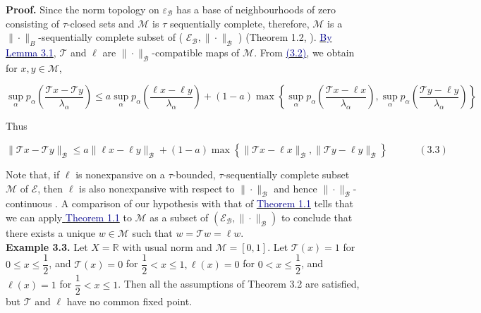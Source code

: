 \documentclass[12pt,a4paper,two side]{article}
\begin{document}
\textbf{Proof.} Since the norm topology on $\varepsilon_{\mathcal{B}}$ has a base of neighbourhoods of zero consisting of $\tau$-closed sets and $\mathcal{M}$ is $\tau$ sequentially complete, therefore, $\mathcal{M}$ is a $\|\cdot\|_B$-sequentially complete subset of ( $\mathcal{E}_{\mathscr{B}},\|\cdot\|_{\mathcal{B}}$ ) (Theorem 1.2, \cite{citation-key10}). \hyperlink{muc3.1}{\textcolor{Darkblue}{By Lemma 3.1}}, $\mathcal{T}$ and $\ell$ are $\|\cdot\|_{\mathcal{B}}$-compatible maps of $\mathcal{M}$. From \hyperlink{dau3.2}{\textcolor{Darkblue}{(3.2)}}, we obtain for $x, y \in \mathcal{M}$,

$$
\sup _\alpha p_\alpha\left(\frac{\mathcal{T} x-\mathcal{T} y}{\lambda_\alpha}\right) \leq a \sup _\alpha p_\alpha\left(\frac{\ell x-\ell y}{\lambda_\alpha}\right)+(1-a) \max \left\{\sup _\alpha p_\alpha\left(\frac{\mathcal{T} x-\ell x}{\lambda_\alpha}\right), \sup _\alpha p_\alpha\left(\frac{\mathcal{T} y-\ell y}{\lambda_\alpha}\right)\right\}
$$


Thus

$$
\|\mathcal{T} x-\mathcal{T} y\|_{\mathcal{B}} \leq a\|\ell x-\ell y\|_{\mathcal{B}}+(1-a) \max \left\{\|\mathcal{T} x-\ell x\|_{\mathcal{B}},\|\mathcal{T} y-\ell y\|_{\mathcal{B}}\right\}
\ \ \ \ \ \ \ \ \ \ \  \ \ \ (3.3)$$


Note that, if $\ell$ is nonexpansive on a $\tau$-bounded, $\tau$-sequentially complete subset $\mathcal{M}$ of $\mathcal{E}$, then $\ell$ is also nonexpansive with respect to $\|\cdot\|_{\mathcal{B}}$ and hence $\|\cdot\|_{\mathcal{B}}$-continuous \cite{citation-key8}. A comparison of our hypothesis with that of \hyperlink{muc1.1}{\textcolor{Darkblue}{Theorem 1.1}} tells that we can apply\hyperlink{muc1.1}{ \textcolor{Darkblue}{Theorem 1.1}} to $\mathcal{M}$ as a subset of $\left(\mathcal{E}_{\mathcal{B}},\|\cdot\|_{\mathcal{B}}\right)$ to conclude that there exists a unique $w \in \mathcal{M}$ such that $w=\mathcal{T} w=\ell w$.\\

\textbf{Example 3.3.} Let $X=\mathbb{R}$ with usual norm and $\mathcal{M}=[0,1]$. Let $\mathcal{T}(x)=1$ for $0 \leq x \leq \dfrac{1}{2}$, and $\mathcal{T}(x)=0$ for $\dfrac{1}{2}<x \leq 1, \ell(x)=0$ for $0<x \leq \dfrac{1}{2}$, and $\ell(x)=1$ for $\dfrac{1}{2}<x \leq 1$. Then all the assumptions of Theorem 3.2 are satisfied, but $\mathcal{T}$ and $\ell$ have no common fixed point.\\
\end{document}
